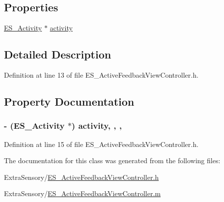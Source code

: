 \subsection*{Properties}
\begin{DoxyCompactItemize}
\item 
\hyperlink{interface_e_s___activity}{E\+S\+\_\+\+Activity} $\ast$ \hyperlink{interface_e_s___active_feedback_view_controller_af5192f415e5e0e1694aa83a9e138e895}{activity}
\end{DoxyCompactItemize}


\subsection{Detailed Description}


Definition at line 13 of file E\+S\+\_\+\+Active\+Feedback\+View\+Controller.\+h.



\subsection{Property Documentation}
\hypertarget{interface_e_s___active_feedback_view_controller_af5192f415e5e0e1694aa83a9e138e895}{
\subsubsection[{activity}]{\setlength{\rightskip}{0pt plus 5cm}-\/ ({\bf E\+S\+\_\+\+Activity} $\ast$) activity\hspace{0.3cm}{\ttfamily [read]}, {\ttfamily [write]}, {\ttfamily [nonatomic]}, {\ttfamily [strong]}}}\label{interface_e_s___active_feedback_view_controller_af5192f415e5e0e1694aa83a9e138e895}


Definition at line 15 of file E\+S\+\_\+\+Active\+Feedback\+View\+Controller.\+h.



The documentation for this class was generated from the following files\+:\begin{DoxyCompactItemize}
\item 
Extra\+Sensory/\hyperlink{_e_s___active_feedback_view_controller_8h}{E\+S\+\_\+\+Active\+Feedback\+View\+Controller.\+h}\item 
Extra\+Sensory/\hyperlink{_e_s___active_feedback_view_controller_8m}{E\+S\+\_\+\+Active\+Feedback\+View\+Controller.\+m}\end{DoxyCompactItemize}
